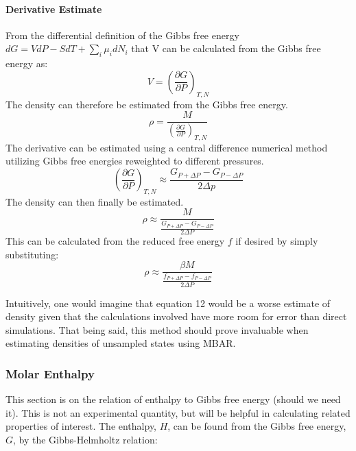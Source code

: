 \documentclass[9pt,bestpractices]{livecoms}
\begin{document}
\paragraph{Derivative Estimate}
 From the differential definition of the Gibbs free energy $dG = VdP -SdT + \sum_i \mu_i dN_i$ that V can be calculated from the Gibbs free energy as:
\begin{equation} V = \left( \frac{\partial G}{\partial P} \right)_{T,N} \end{equation}
 The density can therefore be estimated from the Gibbs free energy.
\begin{equation} \rho = \frac{M}{ \left( \frac{\partial G}{\partial P} \right)_{T,N}} \end{equation}
 The derivative can be estimated using a central difference numerical method utilizing Gibbs free energies reweighted to different pressures.
\begin{equation} \left( \frac{\partial G}{\partial P} \right)_{T,N} \approx \frac{G_{P + \Delta P} - G_{P-\Delta P}}{2\Delta p} \end{equation}
 The density can then finally be estimated.
\begin{equation} \rho \approx \frac{M}{\frac{G_{P + \Delta P} - G_{P-\Delta P}}{2\Delta P}} \end{equation}
This can be calculated from the reduced free energy $f$ if desired by simply substituting:
\begin{equation} \rho \approx \frac{\beta M}{\frac{f_{P + \Delta P} - f_{P-\Delta P}}{2\Delta P}} \end{equation}

Intuitively, one would imagine that equation 12 would be a worse estimate of density given that the calculations involved have more room for error than direct simulations. That being said, this method should prove invaluable when estimating densities of unsampled states using MBAR. 


\subsubsection{Molar Enthalpy}
This section is on the relation of enthalpy to Gibbs free energy (should we need it). This is not an experimental quantity, but will be helpful in calculating related properties of interest. The enthalpy, $H$, can be found from the Gibbs free energy, $G$, by the Gibbs-Helmholtz relation: 
\end{document}
